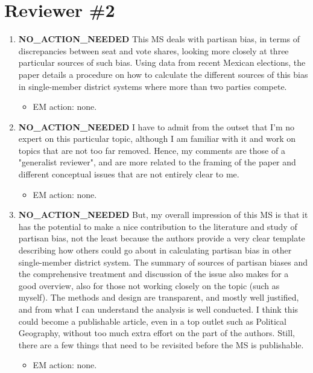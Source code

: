 \documentclass{article}
\begin{document}
\section{Reviewer \#2}
\label{sec:orgheadline16}
\begin{enumerate}
\item {\bfseries\sffamily NO\_ACTION\_NEEDED} This MS deals with partisan bias, in terms of discrepancies between seat and vote shares, looking more closely at three particular sources of such bias. Using data from recent Mexican elections, the paper details a procedure on how to calculate the different sources of this bias in single-member district systems where more than two parties compete.
\label{sec:orgheadline3}
\begin{itemize}
\item EM action: none.
\end{itemize}
\item {\bfseries\sffamily NO\_ACTION\_NEEDED} I have to admit from the outset that I'm no expert on this particular topic, although I am familiar with it and work on topics that are not too far removed. Hence, my comments are those of a "generalist reviewer", and are more related to the framing of the paper and different conceptual issues that are not entirely clear to me.
\label{sec:orgheadline4}
\begin{itemize}
\item EM action: none.
\end{itemize}
\item {\bfseries\sffamily NO\_ACTION\_NEEDED} But, my overall impression of this MS is that it has the potential to make a nice contribution to the literature and study of partisan bias, not the least because the authors provide a very clear template describing how others could go about in calculating partisan bias in other single-member district system. The summary of sources of partisan biases and the comprehensive treatment and discussion of the issue also makes for a good overview, also for those not working closely on the topic (such as myself). The methods and design are transparent, and mostly well justified, and from what I can understand the analysis is well conducted. I think this could become a publishable article, even in a top outlet such as Political Geography, without too much extra effort on the part of the authors. Still, there are a few things that need to be revisited before the MS is publishable.
\label{sec:orgheadline5}
\begin{itemize}
\item EM action: none.

\end{itemize}
\end{enumerate}
\end{document}
